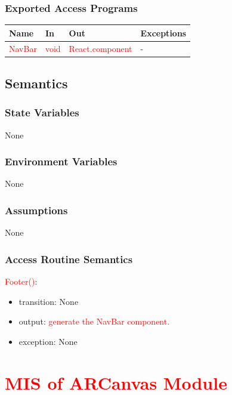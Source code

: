 \documentclass[12pt, titlepage]{article}
\begin{document}
\subsubsection{Exported Access Programs}
\begin{center}
\begin{tabular}{p{4cm} p{3cm} p{4cm} p{4cm}}
\hline
\textbf{Name} & \textbf{In} & \textbf{Out} & \textbf{Exceptions} \\
\hline
\textcolor{red}{NavBar} & \textcolor{red}{void} & \textcolor{red}{React.component} & - \\
\hline
\end{tabular}
\end{center}

\subsection{Semantics}

\subsubsection{State Variables}
None

\subsubsection{Environment Variables}
None

\subsubsection{Assumptions}
None

\subsubsection{Access Routine Semantics}

\noindent \textcolor{red}{Footer()}:
\begin{itemize}
\item transition: None 
\item output: \textcolor{red}{generate the NavBar component.}
\item exception: None
\end{itemize}
\newpage




\section{\textcolor{red}{MIS of ARCanvas Module}}
\end{document}
